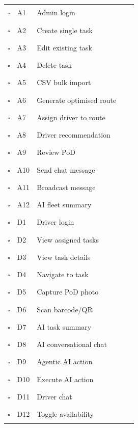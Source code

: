 \documentclass[11pt,a4paper]{article}
\newcommand{\checkbox}{$\square$\;}
\begin{document}
\begin{center}
\begin{longtable}{@{}p{0.4cm} p{1.2cm} p{4.5cm} p{1.5cm} p{4.5cm}@{}}
  \checkbox & A1  & Admin login            & \rule{1.5cm}{0.4pt} & \\
  \checkbox & A2  & Create single task     & \rule{1.5cm}{0.4pt} & \\
  \checkbox & A3  & Edit existing task     & \rule{1.5cm}{0.4pt} & \\
  \checkbox & A4  & Delete task            & \rule{1.5cm}{0.4pt} & \\
  \checkbox & A5  & CSV bulk import        & \rule{1.5cm}{0.4pt} & \\
  \checkbox & A6  & Generate optimised route & \rule{1.5cm}{0.4pt} & \\
  \checkbox & A7  & Assign driver to route & \rule{1.5cm}{0.4pt} & \\
  \checkbox & A8  & Driver recommendation  & \rule{1.5cm}{0.4pt} & \\
  \checkbox & A9  & Review PoD             & \rule{1.5cm}{0.4pt} & \\
  \checkbox & A10 & Send chat message      & \rule{1.5cm}{0.4pt} & \\
  \checkbox & A11 & Broadcast message      & \rule{1.5cm}{0.4pt} & \\
  \checkbox & A12 & AI fleet summary       & \rule{1.5cm}{0.4pt} & \\
  \midrule
  \checkbox & D1  & Driver login           & \rule{1.5cm}{0.4pt} & \\
  \checkbox & D2  & View assigned tasks    & \rule{1.5cm}{0.4pt} & \\
  \checkbox & D3  & View task details      & \rule{1.5cm}{0.4pt} & \\
  \checkbox & D4  & Navigate to task       & \rule{1.5cm}{0.4pt} & \\
  \checkbox & D5  & Capture PoD photo      & \rule{1.5cm}{0.4pt} & \\
  \checkbox & D6  & Scan barcode/QR        & \rule{1.5cm}{0.4pt} & \\
  \checkbox & D7  & AI task summary        & \rule{1.5cm}{0.4pt} & \\
  \checkbox & D8  & AI conversational chat & \rule{1.5cm}{0.4pt} & \\
  \checkbox & D9  & Agentic AI action      & \rule{1.5cm}{0.4pt} & \\
  \checkbox & D10 & Execute AI action      & \rule{1.5cm}{0.4pt} & \\
  \checkbox & D11 & Driver chat            & \rule{1.5cm}{0.4pt} & \\
  \checkbox & D12 & Toggle availability    & \rule{1.5cm}{0.4pt} & \\

\end{longtable}
\end{center}
\end{document}
